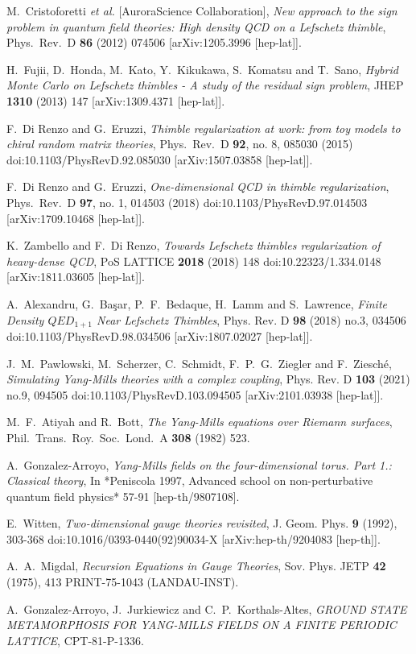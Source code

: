 \documentclass[a4paper,11pt]{article}
\begin{document}
\begin{thebibliography}{99}
M.~Cristoforetti {\it et al.}  [AuroraScience Collaboration],
{\em New approach to the sign problem in quantum field theories: High density QCD on a Lefschetz thimble},
Phys.\ Rev.\ D {\bf 86} (2012) 074506
[arXiv:1205.3996 [hep-lat]].

H.~Fujii, D.~Honda, M.~Kato, Y.~Kikukawa, S.~Komatsu and T.~Sano,
{\em Hybrid Monte Carlo on Lefschetz thimbles - A study of the residual sign problem},
JHEP {\bf 1310} (2013) 147
[arXiv:1309.4371 [hep-lat]].

F.~Di Renzo and G.~Eruzzi,
{\em Thimble regularization at work: from toy models to chiral random matrix theories},
Phys.\ Rev.\ D {\bf 92}, no. 8, 085030 (2015)
doi:10.1103/PhysRevD.92.085030
[arXiv:1507.03858 [hep-lat]].

F.~Di Renzo and G.~Eruzzi,
{\em One-dimensional QCD in thimble regularization},
Phys.\ Rev.\ D {\bf 97}, no. 1, 014503 (2018)
doi:10.1103/PhysRevD.97.014503
[arXiv:1709.10468 [hep-lat]].

K.~Zambello and F.~Di Renzo,
\emph{Towards Lefschetz thimbles regularization of heavy-dense QCD},
PoS LATTICE {\bf 2018} (2018) 148
doi:10.22323/1.334.0148
[arXiv:1811.03605 [hep-lat]].

A.~Alexandru, G.~Ba\c{s}ar, P.~F.~Bedaque, H.~Lamm and S.~Lawrence,
{\em Finite Density $QED_{1+1}$ Near Lefschetz Thimbles},
Phys. Rev. D \textbf{98} (2018) no.3, 034506
doi:10.1103/PhysRevD.98.034506
[arXiv:1807.02027 [hep-lat]].

J.~M.~Pawlowski, M.~Scherzer, C.~Schmidt, F.~P.~G.~Ziegler and F.~Ziesch\'e,
{\em Simulating Yang-Mills theories with a complex coupling},
Phys. Rev. D \textbf{103} (2021) no.9, 094505
doi:10.1103/PhysRevD.103.094505
[arXiv:2101.03938 [hep-lat]].

M.~F.~Atiyah and R.~Bott,
{\em The Yang-Mills equations over Riemann surfaces},
Phil.\ Trans.\ Roy.\ Soc.\ Lond.\ A {\bf 308} (1982) 523.

A.~Gonzalez-Arroyo,
{\em Yang-Mills fields on the four-dimensional torus. Part 1.: Classical theory},
In *Peniscola 1997, Advanced school on non-perturbative quantum field physics* 57-91
[hep-th/9807108].

E.~Witten,
{\em Two-dimensional gauge theories revisited},
J. Geom. Phys. \textbf{9} (1992), 303-368
doi:10.1016/0393-0440(92)90034-X
[arXiv:hep-th/9204083 [hep-th]].

A.~A.~Migdal,
{\em Recursion Equations in Gauge Theories},
Sov. Phys. JETP \textbf{42} (1975), 413
PRINT-75-1043 (LANDAU-INST).

A.~Gonzalez-Arroyo, J.~Jurkiewicz and C.~P.~Korthals-Altes,
{\em GROUND STATE METAMORPHOSIS FOR YANG-MILLS FIELDS ON A FINITE PERIODIC LATTICE},
CPT-81-P-1336.

\end{thebibliography}
\end{document}
